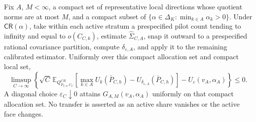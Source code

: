 Fix \(A\), \(M<\infty\), a compact set of representative local directions whose quotient norms are at most \(M\), and a compact subset of \(\{\alpha\in\Delta_K:\min_{k\in A}\alpha_k>0\}\).  Under \(\mathsf{CR}(\alpha)\), take within each active stratum a prespecified pilot count tending to infinity and equal to \(o(C_{C,k})\), estimate \(\widehat\Sigma_{C,A}\), snap it outward to a prespecified rational covariance partition, compute \(\delta_{\varepsilon,A}\), and apply it to the remaining calibrated estimator.  Uniformly over this compact allocation set and compact local set,
\[
\limsup_{C\to\infty}\left\{\sqrt C\,\mathbb E_{Q^{CR}_{\bar P_{C,h},C_C}}
\left[\max_{k\in A}U_k(\bar P_{C,h})-U_{\delta_{\varepsilon,A}}(\bar P_{C,h})\right]
-U_\varepsilon(v_A,\alpha_A)\right\}\leq0.
\]
A diagonal choice \(\varepsilon_C\downarrow0\) attains \(G_{A,M}(v_A,\alpha_A)\) uniformly on that compact allocation set.  No transfer is asserted as an active share vanishes or the active face changes.